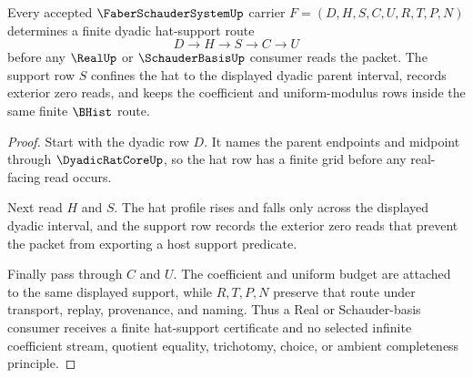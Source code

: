 \begin{theorem}
\label{thm:faber-schauder-system-dyadic-hat-support}
Every accepted $\FaberSchauderSystemUp$ carrier $F=(D,H,S,C,U,R,T,P,N)$ determines a finite dyadic hat-support route
$$
D \longrightarrow H \longrightarrow S \longrightarrow C \longrightarrow U
$$
before any $\RealUp$ or $\SchauderBasisUp$ consumer reads the packet. The support row $S$ confines the hat to the displayed dyadic parent interval, records exterior zero reads, and keeps the coefficient and uniform-modulus rows inside the same finite $\BHist$ route.
\end{theorem}
\begin{proof}
Start with the dyadic row $D$. It names the parent endpoints and midpoint through $\DyadicRatCoreUp$, so the hat row has a finite grid before any real-facing read occurs.

Next read $H$ and $S$. The hat profile rises and falls only across the displayed dyadic interval, and the support row records the exterior zero reads that prevent the packet from exporting a host support predicate.

Finally pass through $C$ and $U$. The coefficient and uniform budget are attached to the same displayed support, while $R,T,P,N$ preserve that route under transport, replay, provenance, and naming. Thus a Real or Schauder-basis consumer receives a finite hat-support certificate and no selected infinite coefficient stream, quotient equality, trichotomy, choice, or ambient completeness principle.
\end{proof}

